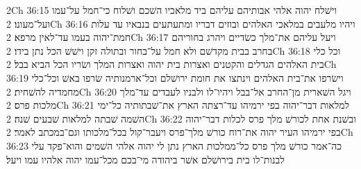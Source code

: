 2Ch 36:15  וישׁלח יהוה אלהי אבותיהם עליהם ביד מלאכיו השׁכם ושׁלוח כי־חמל על־עמו ועל־מעונו׃
2Ch 36:16  ויהיו מלעבים במלאכי האלהים ובוזים דבריו ומתעתעים בנבאיו עד עלות חמת־יהוה בעמו עד־לאין מרפא׃
2Ch 36:17  ויעל עליהם את־מלך כשׂדיים ויהרג בחוריהם בחרב בבית מקדשׁם ולא חמל על־בחור ובתולה זקן וישׁשׁ הכל נתן בידו׃
2Ch 36:18  וכל כלי בית האלהים הגדלים והקטנים ואצרות בית יהוה ואצרות המלך ושׂריו הכל הביא בבל׃
2Ch 36:19  וישׂרפו את־בית האלהים וינתצו את חומת ירושׁלם וכל־ארמנותיה שׂרפו באשׁ וכל־כלי מחמדיה להשׁחית׃
2Ch 36:20  ויגל השׁארית מן־החרב אל־בבל ויהיו־לו ולבניו לעבדים עד־מלך מלכות פרס׃
2Ch 36:21  למלאות דבר־יהוה בפי ירמיהו עד־רצתה הארץ את־שׁבתותיה כל־ימי השׁמה שׁבתה למלאות שׁבעים שׁנה׃
2Ch 36:22  ובשׁנת אחת לכורשׁ מלך פרס לכלות דבר־יהוה בפי ירמיהו העיר יהוה את־רוח כורשׁ מלך־פרס ויעבר־קול בכל־מלכותו וגם־במכתב לאמר׃
2Ch 36:23  כה־אמר כורשׁ מלך פרס כל־ממלכות הארץ נתן לי יהוה אלהי השׁמים והוא־פקד עלי לבנות־לו בית בירושׁלם אשׁר ביהודה מי־בכם מכל־עמו יהוה אלהיו עמו ויעל׃



